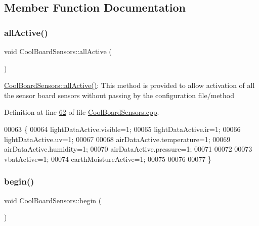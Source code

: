 \subsection{Member Function Documentation}
\mbox{\label{class_cool_board_sensors_aa432c5aac88f89c31a10766390f23e0b}} 
\subsubsection{\texorpdfstring{all\+Active()}{allActive()}}
{\footnotesize\ttfamily void Cool\+Board\+Sensors\+::all\+Active (\begin{DoxyParamCaption}{ }\end{DoxyParamCaption})}

\hyperlink{class_cool_board_sensors_aa432c5aac88f89c31a10766390f23e0b}{Cool\+Board\+Sensors\+::all\+Active()}\+: This method is provided to allow activation of all the sensor board sensors without passing by the configuration file/method 

Definition at line \hyperlink{_cool_board_sensors_8cpp_source_l00062}{62} of file \hyperlink{_cool_board_sensors_8cpp_source}{Cool\+Board\+Sensors.\+cpp}.


\begin{DoxyCode}
00063 \{
00064     lightDataActive.visible=1;
00065     lightDataActive.ir=1;
00066     lightDataActive.uv=1;   
00067 
00068     airDataActive.temperature=1;
00069     airDataActive.humidity=1;
00070     airDataActive.pressure=1;
00071 
00072 
00073     vbatActive=1;
00074     earthMoistureActive=1;
00075 
00076 
00077 \}
\end{DoxyCode}
\mbox{\label{class_cool_board_sensors_a97095823ef7c8f5290812f1405b966b3}} 
\subsubsection{\texorpdfstring{begin()}{begin()}}
{\footnotesize\ttfamily void Cool\+Board\+Sensors\+::begin (\begin{DoxyParamCaption}{ }\end{DoxyParamCaption})}

